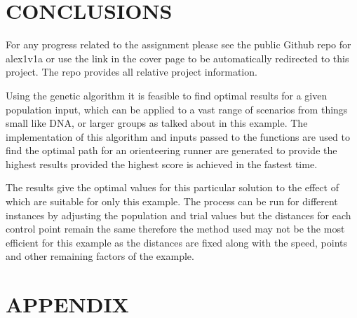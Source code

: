 \documentclass[a4paper, 10pt]{IEEEconf}
\begin{document}


\clearpage
\section{CONCLUSIONS}

For any progress related to the assignment please see the public Github repo for alex1v1a or use the link in the cover page to be automatically redirected to this project. The repo provides all relative project information.

Using the genetic algorithm it is feasible to find optimal results for a given population input, which can be applied to a vast range of scenarios from things small like DNA, or larger groups as talked about in this example. The implementation of this algorithm and inputs passed to the functions are used to find the optimal path for an orienteering runner are generated to provide the highest results provided the highest score is achieved in the fastest time. 

The results give the optimal values for this particular solution to the effect of which are suitable for only this example. The process can be run for different instances by adjusting the population and trial values but the distances for each control point remain the same therefore the method used may not be the most efficient for this example as the distances are fixed along with the speed, points and other remaining factors of the example.               


%
%


%
\section*{APPENDIX}
\end{document}
